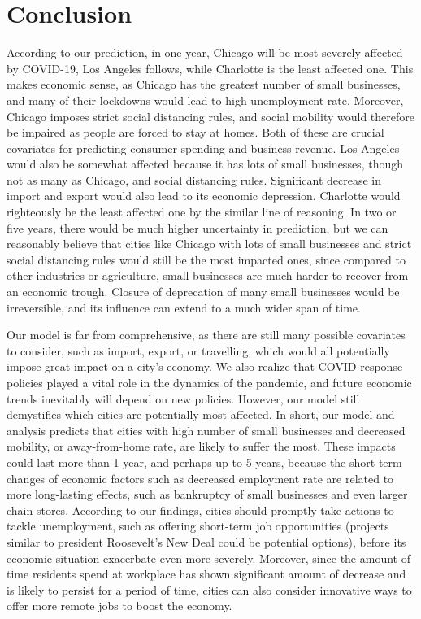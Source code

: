 \documentclass{article}
\begin{document}
\section{Conclusion}
According to our prediction, in one year, Chicago will be most severely affected by COVID-19, Los Angeles follows, while Charlotte is the least affected one. This makes economic sense, as Chicago has the greatest number of small businesses, and many of their lockdowns would lead to high unemployment rate. Moreover, Chicago imposes strict social distancing rules, and social mobility would therefore be impaired as people are forced to stay at homes. Both of these are crucial covariates for predicting consumer spending and business revenue. Los Angeles would also be somewhat affected because it has lots of small businesses, though not as many as Chicago, and social distancing rules. Significant decrease in import and export would also lead to its economic depression. Charlotte would righteously be the least affected one by the similar line of reasoning. In two or five years, there would be much higher uncertainty in prediction, but we can reasonably believe that cities like Chicago with lots of small businesses and strict social distancing rules would still be the most impacted ones, since compared to other industries or agriculture, small businesses are much harder to recover from an economic trough. Closure of deprecation of many small businesses would be irreversible, and its influence can extend to a much wider span of time.

\par
Our model is far from comprehensive, as there are still many possible covariates to consider, such as import, export, or travelling, which would all potentially impose great impact on a city's economy. We also realize that COVID response policies played a vital role in the dynamics of the pandemic, and future economic trends inevitably will depend on new policies. However, our model still demystifies which cities are potentially most affected. In short, our model and analysis predicts that cities with high number of small businesses and decreased mobility, or away-from-home rate, are likely to suffer the most. These impacts could last more than 1 year, and perhaps up to 5 years, because the short-term changes of economic factors such as decreased employment rate are related to more long-lasting effects, such as bankruptcy of small businesses and even larger chain stores. According to our findings, cities should promptly take actions to tackle unemployment, such as offering short-term job opportunities (projects similar to president Roosevelt's New Deal could be potential options), before its economic situation exacerbate even more severely. Moreover, since the amount of time residents spend at workplace has shown significant amount of decrease and is likely to persist for a period of time, cities can also consider innovative ways to offer more remote jobs to boost the economy.

\newpage



\end{document}
